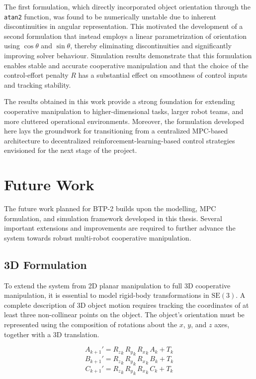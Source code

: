 \documentclass[12pt,english]{report}
\begin{document}
The first formulation, which directly incorporated object orientation through the \texttt{atan2} function, was found to be numerically unstable due to inherent discontinuities in angular representation. This motivated the development of a second formulation that instead employs a linear parametrization of orientation using $\cos\theta$ and $\sin\theta$, thereby eliminating discontinuities and significantly improving solver behaviour. Simulation results demonstrate that this formulation enables stable and accurate cooperative manipulation and that the choice of the control-effort penalty $R$ has a substantial effect on smoothness of control inputs and tracking stability.

The results obtained in this work provide a strong foundation for extending cooperative manipulation to higher-dimensional tasks, larger robot teams, and more cluttered operational environments. Moreover, the formulation developed here lays the groundwork for transitioning from a centralized MPC-based architecture to decentralized reinforcement-learning-based control strategies envisioned for the next stage of the project.


\chapter{Future Work}

The future work planned for BTP-2 builds upon the modelling, MPC formulation, and simulation framework developed in this thesis. Several important extensions and improvements are required to further advance the system towards robust multi-robot cooperative manipulation.


\section{3D Formulation}

To extend the system from 2D planar manipulation to full 3D cooperative manipulation, it is essential to model rigid-body transformations in $\mathrm{SE}(3)$. A complete description of 3D object motion requires tracking the coordinates of at least three non-collinear points on the object. The object's orientation must be represented using the composition of rotations about the $x$, $y$, and $z$ axes, together with a 3D translation.

\[
A_{k+1}' = {R_z}_k\, {R_y}_k\, {R_x}_k\, A_k + T_k
\]
\[
B_{k+1}' = {R_z}_k\, {R_y}_k\, {R_x}_k\, B_k + T_k
\]
\[
C_{k+1}' = {R_z}_k\, {R_y}_k\, {R_x}_k\, C_k + T_k
\]
\end{document}
